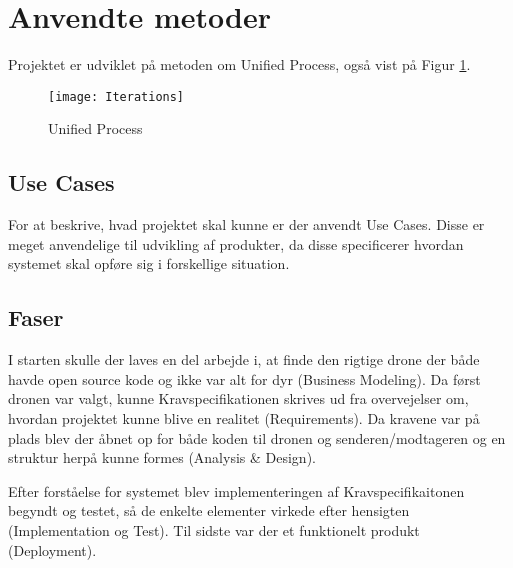 \documentclass[Main]{subfiles}
\begin{document}
\section{Anvendte metoder}

Projektet er udviklet på metoden om Unified Process\cite[s. 74]{Larman}, også vist på Figur \ref{Fig:UP}.

\begin{figure}[H]
\centering
\texttt{[image: Iterations]}
\caption{Unified Process}
\label{Fig:UP}
\end{figure}




\subsection{Use Cases}
For at beskrive, hvad projektet skal kunne er der anvendt Use Cases.
Disse er meget anvendelige til udvikling af produkter, da disse specificerer hvordan systemet skal opføre sig i forskellige situation.




\subsection{Faser}
I starten skulle der laves en del arbejde i, at finde den rigtige drone der både havde open source kode og ikke var alt for dyr (Business Modeling).
Da først dronen var valgt, kunne Kravspecifikationen\cite{Kravspec} skrives ud fra overvejelser om, hvordan projektet kunne blive en realitet (Requirements).
Da kravene var på plads blev der åbnet op for både koden til dronen og senderen/modtageren og en struktur herpå kunne formes (Analysis \& Design).

Efter forståelse for systemet blev implementeringen af Kravspecifikaitonen begyndt og testet, så de enkelte elementer virkede efter hensigten (Implementation og Test).
Til sidste var der et funktionelt produkt (Deployment).
\end{document}
